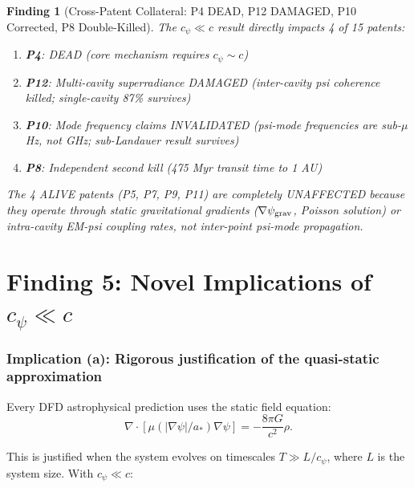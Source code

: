 \documentclass[11pt]{article}
\newtheorem{finding}{Finding}
\begin{document}
\begin{finding}[Cross-Patent Collateral: P4 DEAD, P12 DAMAGED, P10 Corrected,
P8 Double-Killed]
\label{find:collateral}
The $c_\psi \ll c$ result directly impacts 4 of 15 patents:
\begin{enumerate}[nosep]
\item \textbf{P4}: DEAD (core mechanism requires $c_\psi \sim c$)
\item \textbf{P12}: Multi-cavity superradiance DAMAGED (inter-cavity psi
  coherence killed; single-cavity 87\% survives)
\item \textbf{P10}: Mode frequency claims INVALIDATED (psi-mode frequencies
  are sub-$\mu$Hz, not GHz; sub-Landauer result survives)
\item \textbf{P8}: Independent second kill (475 Myr transit time to 1 AU)
\end{enumerate}

The 4 ALIVE patents (P5, P7, P9, P11) are completely UNAFFECTED because
they operate through static gravitational gradients ($\nabla\psi_{\rm grav}$,
Poisson solution) or intra-cavity EM-psi coupling rates, not inter-point
psi-mode propagation.
\end{finding}


\part{Finding 5: Novel Implications of $c_\psi \ll c$}
\label{part:implications}

\section{Implication (a): Rigorous justification of the quasi-static approximation}

Every DFD astrophysical prediction uses the static field equation:
\begin{equation}
\nabla\cdot[\mu(|\nabla\psi|/a_*)\nabla\psi] = -\frac{8\pi G}{c^2}\rho.
\end{equation}

This is justified when the system evolves on timescales $T \gg L/c_\psi$,
where $L$ is the system size. With $c_\psi \ll c$:
\end{document}
